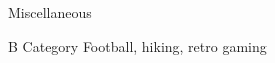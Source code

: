 
\begin{rubric}{Miscellaneous}

  B Category
\entry*[Hobbies:]
  Football, hiking, retro gaming

\end{rubric}

